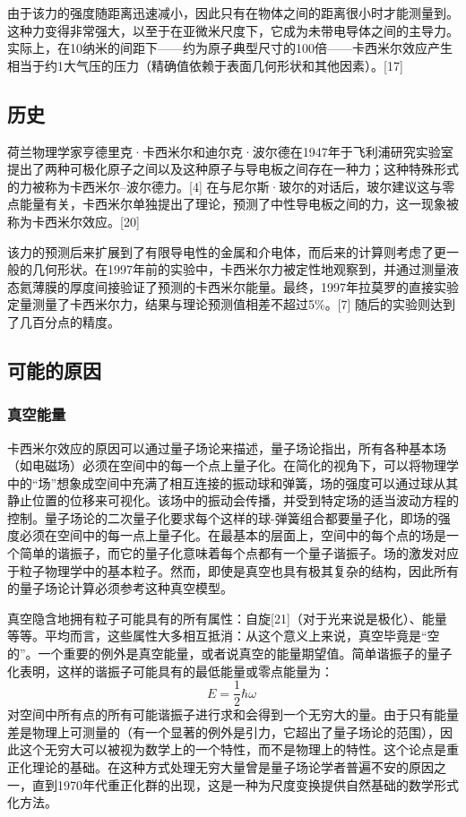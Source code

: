 由于该力的强度随距离迅速减小，因此只有在物体之间的距离很小时才能测量到。这种力变得非常强大，以至于在亚微米尺度下，它成为未带电导体之间的主导力。实际上，在10纳米的间距下——约为原子典型尺寸的100倍——卡西米尔效应产生相当于约1大气压的压力（精确值依赖于表面几何形状和其他因素）。[17]
\subsection{历史}
荷兰物理学家亨德里克·卡西米尔和迪尔克·波尔德在1947年于飞利浦研究实验室提出了两种可极化原子之间以及这种原子与导电板之间存在一种力；这种特殊形式的力被称为卡西米尔–波尔德力。[4] 在与尼尔斯·玻尔的对话后，玻尔建议这与零点能量有关，卡西米尔单独提出了理论，预测了中性导电板之间的力，这一现象被称为卡西米尔效应。[20]

该力的预测后来扩展到了有限导电性的金属和介电体，而后来的计算则考虑了更一般的几何形状。在1997年前的实验中，卡西米尔力被定性地观察到，并通过测量液态氦薄膜的厚度间接验证了预测的卡西米尔能量。最终，1997年拉莫罗的直接实验定量测量了卡西米尔力，结果与理论预测值相差不超过5\%。[7] 随后的实验则达到了几百分点的精度。
\subsection{可能的原因}
\subsubsection{真空能量}
卡西米尔效应的原因可以通过量子场论来描述，量子场论指出，所有各种基本场（如电磁场）必须在空间中的每一个点上量子化。在简化的视角下，可以将物理学中的“场”想象成空间中充满了相互连接的振动球和弹簧，场的强度可以通过球从其静止位置的位移来可视化。该场中的振动会传播，并受到特定场的适当波动方程的控制。量子场论的二次量子化要求每个这样的球-弹簧组合都要量子化，即场的强度必须在空间中的每一点上量子化。在最基本的层面上，空间中的每个点的场是一个简单的谐振子，而它的量子化意味着每个点都有一个量子谐振子。场的激发对应于粒子物理学中的基本粒子。然而，即使是真空也具有极其复杂的结构，因此所有的量子场论计算必须参考这种真空模型。

真空隐含地拥有粒子可能具有的所有属性：自旋[21]（对于光来说是极化）、能量等等。平均而言，这些属性大多相互抵消：从这个意义上来说，真空毕竟是“空的”。一个重要的例外是真空能量，或者说真空的能量期望值。简单谐振子的量子化表明，这样的谐振子可能具有的最低能量或零点能量为：
\[ E = \frac{1}{2} \hbar \omega ~\]
对空间中所有点的所有可能谐振子进行求和会得到一个无穷大的量。由于只有能量差是物理上可测量的（有一个显著的例外是引力，它超出了量子场论的范围），因此这个无穷大可以被视为数学上的一个特性，而不是物理上的特性。这个论点是重正化理论的基础。在这种方式处理无穷大量曾是量子场论学者普遍不安的原因之一，直到1970年代重正化群的出现，这是一种为尺度变换提供自然基础的数学形式化方法。

